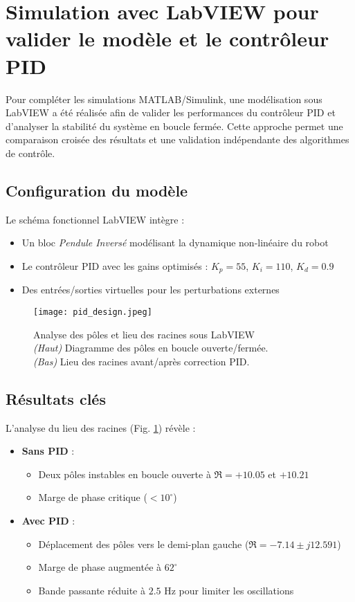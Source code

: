 \documentclass{report}
\begin{document}
\section{Simulation avec LabVIEW pour valider le modèle et le contrôleur PID}
\label{sec:labview_sim}

Pour compléter les simulations MATLAB/Simulink, une modélisation sous LabVIEW a été réalisée afin de valider les performances du contrôleur PID et d'analyser la stabilité du système en boucle fermée. Cette approche permet une comparaison croisée des résultats et une validation indépendante des algorithmes de contrôle.

\subsection{Configuration du modèle}
Le schéma fonctionnel LabVIEW intègre :
\begin{itemize}
    \item Un bloc \textit{Pendule Inversé} modélisant la dynamique non-linéaire du robot
    \item Le contrôleur PID avec les gains optimisés : $K_p = 55$, $K_i = 110$, $K_d = 0.9$
    \item Des entrées/sorties virtuelles pour les perturbations externes
\end{itemize}

\begin{figure}[htbp]
    \centering
    \texttt{[image: pid\_design.jpeg]}
    \caption{Analyse des pôles et lieu des racines sous LabVIEW \\ 
    \small\textit{(Haut)} Diagramme des pôles en boucle ouverte/fermée. \\
    \textit{(Bas)} Lieu des racines avant/après correction PID.}
    \label{fig:labview_pid}
\end{figure}

\subsection{Résultats clés}
L'analyse du lieu des racines (Fig. \ref{fig:labview_pid}) révèle :

\begin{itemize}
    \item \textbf{Sans PID} : 
    \begin{itemize}
        \item Deux pôles instables en boucle ouverte à $\Re = +10.05$ et $+10.21$
        \item Marge de phase critique ($< 10^\circ$)
    \end{itemize}
    
    \item \textbf{Avec PID} :
    \begin{itemize}
        \item Déplacement des pôles vers le demi-plan gauche ($\Re = -7.14 \pm j12.591$)
        \item Marge de phase augmentée à $62^\circ$
        \item Bande passante réduite à $2.5$ Hz pour limiter les oscillations
    \end{itemize}
\end{itemize}
\end{document}
